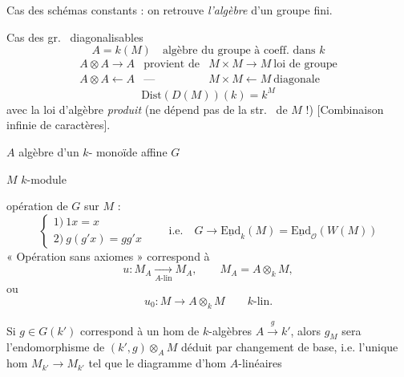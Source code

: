 \documentclass[11pt,a4paper]{article}
\begin{document}
Cas des schémas constants : on retrouve \emph{l'algèbre} d'un groupe fini.

Cas des gr.\  diagonalisables
\[
  A = k(M) \quad \text{algèbre du groupe à coeff.\ dans } k
\]
\[
  \begin{array}{lcl}
    A \otimes A \longrightarrow A & \text{provient de} & M \times M \longrightarrow M \ \text{loi de groupe} \\
    A \otimes A \longleftarrow A & \text{---} & M \times M \longleftarrow M \ \text{diagonale}
  \end{array}
\]
\[
  \mathrm{Dist}(D(M))(k) = k^M
\]
avec la loi d'algèbre \emph{produit} (ne dépend pas de la str.\  de $M$ !) [Combinaison  infinie de caractères].

$A$ algèbre d'un $k$- monoïde affine $G$

$M$ $k$-module

opération de $G$ sur $M$ : \struck{\ill{}}
\[
  \begin{cases} 1)\ 1x = x \\ 2)\ g(g'x) = gg'x \end{cases}
  \qquad \text{i.e.}\quad G \longrightarrow \underline{\mathrm{End}}_k(M) = \underline{\mathrm{End}}_{\mathcal{O}}(W(M))
\]
« Opération sans axiomes » correspond à \struck{\ill{}}
\[
  u : M_A \xrightarrow[A\text{-lin}]{} M_A, \qquad M_A = A \otimes_k M,
\]
ou
\[
  u_0 : M \longrightarrow A \otimes_k M \qquad k\text{-lin.}
\]


Si $g \in G(k')$ correspond à un hom de $k$-algèbres $A \xrightarrow{g} k'$, alors $g_M$ sera l'endomorphisme \struck{\ill{}} de $(k', g) \otimes_A M$  déduit  par changement de base, i.e. l'unique hom $M_{k'} \to M_{k'}$ tel que le diagramme d'hom $A$-linéaires

\end{document}
